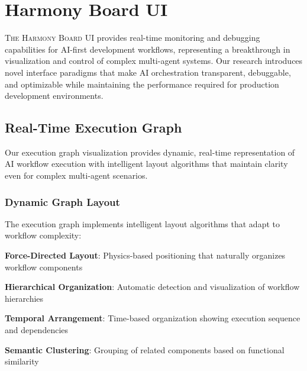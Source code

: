 
\section*{Harmony Board UI}

\lettrine{T}{he Harmony Board UI} provides real-time monitoring and debugging capabilities for AI-first development workflows, representing a breakthrough in visualization and control of complex multi-agent systems. Our research introduces novel interface paradigms that make AI orchestration transparent, debuggable, and optimizable while maintaining the performance required for production development environments.

\subsection*{Real-Time Execution Graph}

Our execution graph visualization provides dynamic, real-time representation of AI workflow execution with intelligent layout algorithms that maintain clarity even for complex multi-agent scenarios.

\subsubsection*{Dynamic Graph Layout}

The execution graph implements intelligent layout algorithms that adapt to workflow complexity:

\begin{expandedlist}
    \item \textbf{Force-Directed Layout}: Physics-based positioning that naturally organizes workflow components
    \item \textbf{Hierarchical Organization}: Automatic detection and visualization of workflow hierarchies
    \item \textbf{Temporal Arrangement}: Time-based organization showing execution sequence and dependencies
    \item \textbf{Semantic Clustering}: Grouping of related components based on functional similarity
\end{expandedlist}

